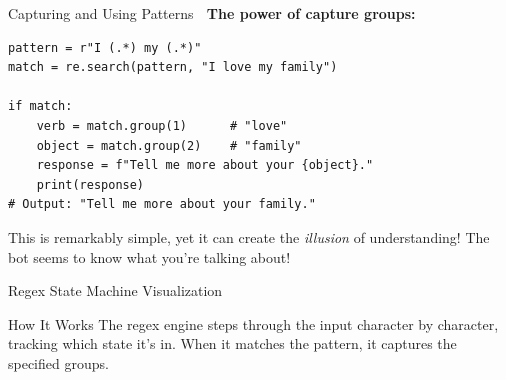 \documentclass[aspectratio=169]{beamer}
\begin{document}
\begin{frame}[fragile]{Capturing and Using Patterns 🎯}
\textbf{The power of capture groups:}

\begin{lstlisting}
pattern = r"I (.*) my (.*)"
match = re.search(pattern, "I love my family")

if match:
    verb = match.group(1)      # "love"
    object = match.group(2)    # "family"
    response = f"Tell me more about your {object}."
    print(response)
# Output: "Tell me more about your family."
\end{lstlisting}

\vspace{0.3cm}

\begin{thinkaboutit}
This is remarkably simple, yet it can create the \textit{illusion} of understanding! The bot seems to know what you're talking about!
\end{thinkaboutit}
\end{frame}

\begin{frame}[shrink=5]{Regex State Machine Visualization 🔧}
\begin{center}
\end{center}

\vspace{0.3cm}

\begin{block}{How It Works}
The regex engine steps through the input character by character, tracking which state it's in. When it matches the pattern, it captures the specified groups.
\end{block}
\end{frame}
\end{document}

